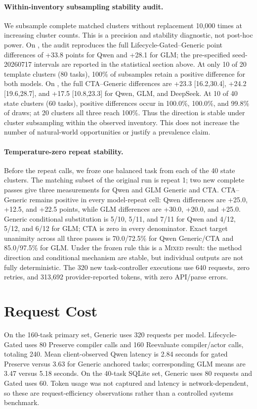 \documentclass[10pt]{article}
\begin{document}
\paragraph{Within-inventory subsampling stability audit.}
We subsample complete matched clusters without replacement 10,000 times at
increasing cluster counts. This is a precision and stability diagnostic, not post-hoc power.
On \PrimaryDiagnostic{}, the audit reproduces the full Lifecycle-Gated--Generic point differences of +33.8 points
for Qwen and +28.1 for GLM; the pre-specified seed-20260717 intervals are reported in the
statistical section above. At only 10 of 20 template clusters (80 tasks), 100\% of subsamples
retain a positive difference for both models. On \NewSchemaReplication{},
the full CTA--Generic differences are +23.3 [16.2,30.4], +24.2 [19.6,28.7], and +17.5
[10.8,23.3] for Qwen, GLM, and DeepSeek. At 10 of 40 state clusters (60 tasks), positive
differences occur in 100.0\%, 100.0\%, and 99.8\% of draws; at 20 clusters all three reach
100\%. Thus the direction is stable under cluster subsampling within the observed inventory.
This does not increase the number of natural-world opportunities or justify a prevalence claim.

\paragraph{Temperature-zero repeat stability.}
Before the repeat calls, we froze one balanced task from each of the 40 \NewSchemaReplication{}
state clusters. The matching subset of the original run is repeat 1; two new complete passes give three measurements for Qwen
and GLM Generic and CTA. CTA--Generic remains positive in every model-repeat cell: Qwen differences
are +25.0, +12.5, and +22.5 points, while GLM differences are +30.0, +20.0, and +25.0. Generic
conditional substitution is 5/10, 5/11, and 7/11 for Qwen and 4/12, 5/12, and 6/12 for GLM; CTA is zero
in every denominator. Exact target unanimity across all three passes is 70.0/72.5\% for Qwen
Generic/CTA and 85.0/97.5\% for GLM. Under the frozen rule this is a \textsc{Mixed} result: the
method direction and conditional mechanism are stable, but individual outputs are not fully
deterministic. The 320 new task-controller executions use 640 requests, zero retries, and 313,692
provider-reported tokens, with zero API/parse errors.

\section{Request Cost}
On the 160-task primary set, Generic uses 320 requests per model. Lifecycle-Gated uses 80
Preserve compiler calls and 160 Reevaluate compiler/actor calls, totaling 240. Mean
client-observed Qwen latency is 2.84 seconds for gated Preserve versus 3.63 for Generic
anchored tasks; corresponding GLM means are 3.47 versus 5.18 seconds. On the 40-task SQLite
set, Generic uses 80 requests and Gated uses 60. Token usage was not captured and latency is
network-dependent, so these are request-efficiency observations rather than a controlled
systems benchmark.
\end{document}
